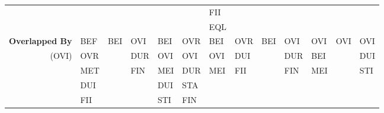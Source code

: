 \documentclass[11pt]{report}
\newenvironment{vvarmargin}[2]
{
  \begin{list}{}
  {
    \setlength{\topsep}{0pt}
    \setlength{\leftmargin}{0pt}
    \setlength{\rightmargin}{0pt}
    \setlength{\listparindent}{\parindent}
    \setlength{\itemindent}{\parindent}
    \setlength{\parsep}{0pt plus 1pt}
    \addtolength{\leftmargin}{#1}\addtolength{\rightmargin}{#2}
  }
  \item
}
{
  \end{list}
}
\begin{document}
\begin{table}[p]
\begin{vvarmargin}{-4cm}{-4cm}
\begin{center}
\begin{tabular}[t]{|r|l|l|l|l|l|l|l|l|l|l|l|l|}
                                        &                         &                         &                         &                         &                         & FII                     &                         &                         &                         &                         &                         &                         \\
                                        &                         &                         &                         &                         &                         & EQL                     &                         &                         &                         &                         &                         &                         \\
                \hline
                \textbf{Overlapped By}  & BEF                     & BEI                     & OVI                     & BEI                     & OVR                     & BEI                     & OVR                     & BEI                     & OVI                     & OVI                     & OVI                     & OVI                     \\
                (OVI)                   & OVR                     &                         & DUR                     & OVI                     & OVI                     & OVI                     & DUI                     &                         & DUR                     & BEI                     &                         & DUI                     \\
                                        & MET                     &                         & FIN                     & MEI                     & DUR                     & MEI                     & FII                     &                         & FIN                     & MEI                     &                         & STI                     \\
                                        & DUI                     &                         &                         & DUI                     & STA                     &                         &                         &                         &                         &                         &                         &                         \\
                                        & FII                     &                         &                         & STI                     & FIN                     &                         &                         &                         &                         &                         &                         &                         \\

\end{tabular}
\end{center}
\end{vvarmargin}
\end{table}
\end{document}

